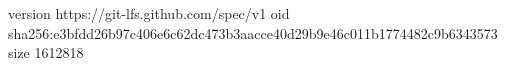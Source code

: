 version https://git-lfs.github.com/spec/v1
oid sha256:e3bfdd26b97c406e6c62dc473b3aacce40d29b9e46c011b1774482c9b6343573
size 1612818
